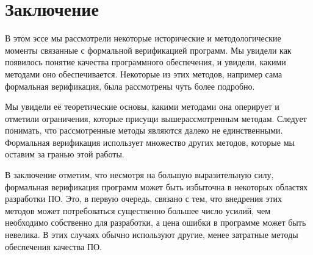 \section{Заключение}

В этом эссе мы рассмотрели некоторые исторические и методологические моменты связанные с формальной верификацией программ. Мы увидели как появилось понятие качества программного обеспечения, и увидели, какими методами оно обеспечивается. Некоторые из этих методов, например сама формальная верификация, была рассмотрены чуть более подробно.

Мы увидели её теоретические основы, какими методами она оперирует и отметили ограничения, которые присущи вышерассмотренным методам. Следует понимать, что рассмотренные методы являются далеко не единственными. Формальная верификация использует множество других методов, которые мы оставим за гранью этой работы.

В заключение отметим, что несмотря на большую выразительную силу, формальная верификация программ может быть избыточна в некоторых областях разработки ПО. Это, в первую очередь, связано с тем, что внедрения этих методов может потребоваться существенно большее число усилий, чем необходимо собственно для разработки, а цена ошибки в программе может быть невелика. В этих случаях обычно используют другие, менее затратные методы обеспечения качества ПО. 
